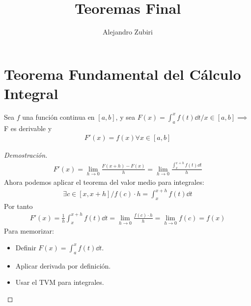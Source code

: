 \documentclass{article}
\title{Teoremas Final}
\author{Alejandro Zubiri}
\begin{document}
\maketitle
\section{Teorema Fundamental del Cálculo Integral}
    Sea $f$ una función continua en $[a,b]$, y sea $F(x)= \int _{a}^x f(t) \dd{t} / x \in [a,b] \implies $ F es
    derivable y
    \begin{equation}
        \begin{split}
            F'(x)=f(x) \forall x \in [a,b]
        \end{split}
    \end{equation}
\begin{proof}[Demostración]
    \begin{equation}
        \begin{split}
            F'(x) = \lim_{h \to 0} \frac{F(x+h) - F(x)}{h} = \lim_{h \to 0} \frac{ \int _{x}^{x+h} f(t) \dd{t}}{h}
        \end{split}
    \end{equation}
    Ahora podemos aplicar el teorema del valor medio para integrales:
    \begin{equation}
        \begin{split}
            \exists c \in [x,x+h] / f(c) \cdot h = \int _{x}^{x+h}f(t) \dd{t}
        \end{split}
    \end{equation}
    Por tanto
    \begin{equation}
        \begin{split}
            F'(x)= \frac{1}{h} \int _{x}^{x+h} f(t) \dd{t} = \lim_{h \to 0} \frac{f(c) \cdot h}{h}=\lim_{h \to 0}f(c)
            =f(x)
        \end{split}
    \end{equation}
Para memorizar:
\begin{itemize}
	\item Definir \(F(x) = \int_a^x f(t) \dd{t}\).
	\item Aplicar derivada por definición.
	\item Usar el TVM para integrales.
\end{itemize}
\end{proof}
\end{document}

